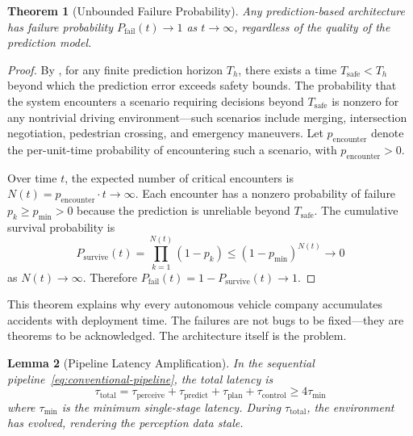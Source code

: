 \documentclass[twocolumn,10pt]{article}
\newtheorem{theorem}{Theorem}[section]
\newtheorem{lemma}[theorem]{Lemma}
\theoremstyle{definition}
\begin{document}
\begin{theorem}[Unbounded Failure Probability]
\label{thm:unbounded-failure}
Any prediction-based architecture has failure probability $P_{\mathrm{fail}}(t) \to 1$ as $t \to \infty$, regardless of the quality of the prediction model.
\end{theorem}

\begin{proof}
By , for any finite prediction horizon $T_h$, there exists a time $T_{\mathrm{safe}} < T_h$ beyond which the prediction error exceeds safety bounds. The probability that the system encounters a scenario requiring decisions beyond $T_{\mathrm{safe}}$ is nonzero for any nontrivial driving environment---such scenarios include merging, intersection negotiation, pedestrian crossing, and emergency maneuvers. Let $p_{\mathrm{encounter}}$ denote the per-unit-time probability of encountering such a scenario, with $p_{\mathrm{encounter}} > 0$.

Over time $t$, the expected number of critical encounters is $N(t) = p_{\mathrm{encounter}} \cdot t \to \infty$. Each encounter has a nonzero probability of failure $p_k \geq p_{\min} > 0$ because the prediction is unreliable beyond $T_{\mathrm{safe}}$. The cumulative survival probability is
\[
P_{\mathrm{survive}}(t) = \prod_{k=1}^{N(t)} (1 - p_k) \leq (1 - p_{\min})^{N(t)} \to 0
\]
as $N(t) \to \infty$. Therefore $P_{\mathrm{fail}}(t) = 1 - P_{\mathrm{survive}}(t) \to 1$.
\end{proof}

This theorem explains why every autonomous vehicle company accumulates accidents with deployment time. The failures are not bugs to be fixed---they are theorems to be acknowledged. The architecture itself is the problem.

\begin{lemma}[Pipeline Latency Amplification]
\label{lem:pipeline-latency}
In the sequential pipeline~\eqref{eq:conventional-pipeline}, the total latency is
\begin{equation}
\tau_{\mathrm{total}} = \tau_{\mathrm{perceive}} + \tau_{\mathrm{predict}} + \tau_{\mathrm{plan}} + \tau_{\mathrm{control}} \geq 4 \tau_{\min}
\end{equation}
where $\tau_{\min}$ is the minimum single-stage latency. During $\tau_{\mathrm{total}}$, the environment has evolved, rendering the perception data stale.
\end{lemma}
\end{document}
